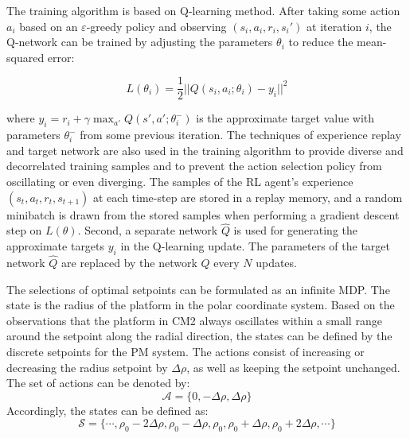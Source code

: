 \begin{sloppypar}
The training algorithm is based on Q-learning method. After taking some action $a_i$ based on an $\varepsilon$-greedy policy and observing $(s_i, a_i, r_i, s_i')$ at iteration $i$, the Q-network can be trained by adjusting the parameters $\theta_i$ to reduce the mean-squared error:

\begin{equation}
L(\theta_i) = \frac{1}{2} || Q(s_i,a_i;\theta_i) - y_i ||^2
\end{equation}

\noindent where $y_i = r_i + \gamma\max_{a'}Q(s',a';\theta_i^-)$ is the approximate target value with parameters $\theta_i^-$ from some previous iteration. The techniques of experience replay and target network are also used in the training algorithm to provide diverse and decorrelated training samples and to prevent the action selection policy from oscillating or even diverging. The samples of the RL agent's experience $(s_t, a_t, r_t, s_{t+1})$ at each time-step are stored in a replay memory, and a random minibatch is drawn from the stored samples when performing a gradient descent step on $L(\theta)$. Second, a separate network $\hat{Q}$ is used for generating the approximate targets $y_i$ in the Q-learning update. The parameters of the target network $\hat{Q}$ are replaced by the network $Q$ every $N$ updates.

The selections of optimal setpoints can be formulated as an infinite MDP. The state is the radius of the platform in the polar coordinate system. Based on the observations that the platform in CM2 always oscillates within a small range around the setpoint along the radial direction, the states can be defined by the discrete setpoints for the PM system. The actions consist of increasing or decreasing the radius setpoint by $\Delta\rho$, as well as keeping the setpoint unchanged. The set of actions can be denoted by:
\begin{equation}
\mathcal{A} = \{ 0, -\Delta\rho, \Delta\rho \}
\end{equation}
Accordingly, the states can be defined as:
\begin{equation}
\mathcal{S} = \{ \cdots, \rho_0 -2\Delta\rho, \rho_0-\Delta\rho, \rho_0, \rho_0 + \Delta\rho, \rho_0 + 2\Delta\rho, \cdots \}
\end{equation}


\end{sloppypar}
